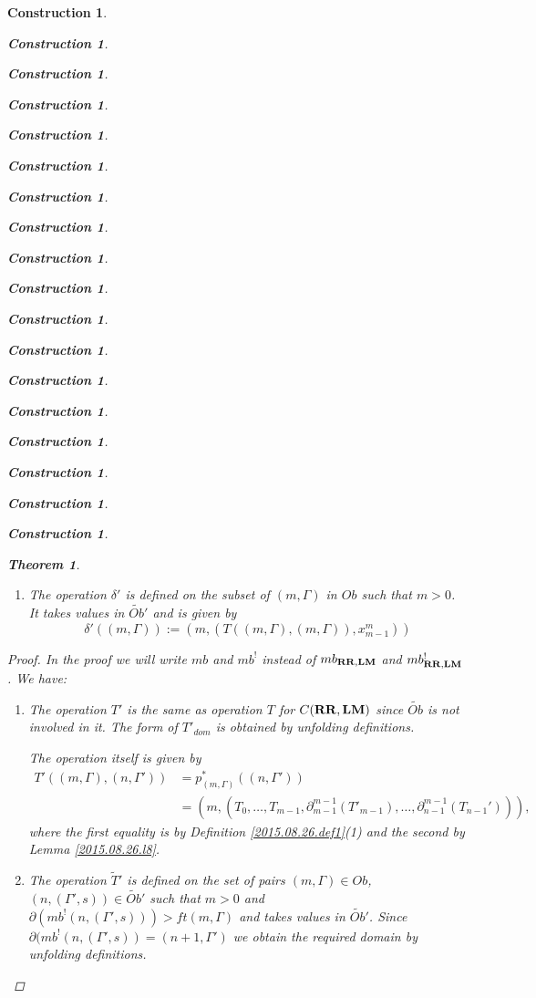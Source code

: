 \documentclass[12pt]{amsart}
\newtheorem{theorem}[proposition]{Theorem}
\numberwithin{proposition}{subsection}
\newtheorem{construction}[proposition]{Construction}
\newcommand{\wt}{\widetilde}
\newcommand{\RR}{{\bf RR}}
\newcommand{\LM}{{\bf LM}}
\begin{document}
\begin{construction}
\begin{construction}
\begin{construction}
\begin{construction}
\begin{construction}
\begin{construction}
\begin{construction}
\begin{construction}
\begin{construction}
\begin{construction}
\begin{construction}
\begin{construction}
\begin{construction}
\begin{construction}
\begin{construction}
\begin{construction}
\begin{construction}
\begin{construction}
\begin{theorem}
\begin{enumerate}
$$\wt{S}'((m,(\Gamma,r)),(n,(\Gamma',s))):=(n-1,(S'((m,(\Gamma,r)),(n+1,\Gamma'))),\theta_{m,n}(r,s))$$
%
\item The operation $\delta'$ is defined on the subset of $(m,\Gamma)$ in $Ob$ such
  that $m>0$. It takes values in $\wt{Ob}'$ and is given by
%
$$\delta'((m,\Gamma)):=(m,(T((m,\Gamma),(m,\Gamma)),x_{m-1}^m))$$
%
\end{enumerate}
\end{theorem}
%
\begin{proof}
In the proof we will write $mb$ and $mb^!$ instead of $mb_{\RR,\LM}$ and
$mb^!_{\RR,\LM}$. We have:
%
\begin{enumerate}
%
\item The operation $T'$ is the same as operation $T$ for $C(\RR,\LM)$ since
  $\wt{Ob}$ is not involved in it. The form of $T'_{dom}$ is obtained by
  unfolding definitions.

The operation itself is given by 
\begin{equation*}
  \begin{split}
    T'((m,\Gamma),(n,\Gamma'))&=p_{(m,\Gamma)}^*((n,\Gamma'))\\
    &=(m,(T_0,\dots,T_{m-1},\partial_{m-1}^{m-1}(T'_{m-1}),\dots, \partial_{n-1}^{m-1}(T_{n-1}'))),
  \end{split}
\end{equation*}
where the first equality is by Definition \ref{2015.08.26.def1}(1) and the second by Lemma \ref{2015.08.26.l8}. 
%
\item The operation $\wt{T}'$ is defined on the set of pairs $(m,\Gamma)\in Ob$,
  $(n,(\Gamma',s))\in \wt{Ob}'$ such that $m>0$ and
  $\partial(mb^!(n,(\Gamma',s)))>ft(m,\Gamma)$ and takes values in
  $\wt{Ob}'$. Since $\partial(mb^!(n,(\Gamma',s))=(n+1,\Gamma')$ we obtain the
  required domain by unfolding definitions.


\end{enumerate}
\end{proof}
\end{construction}
\end{construction}
\end{construction}
\end{construction}
\end{construction}
\end{construction}
\end{construction}
\end{construction}
\end{construction}
\end{construction}
\end{construction}
\end{construction}
\end{construction}
\end{construction}
\end{construction}
\end{construction}
\end{construction}
\end{construction}
\end{document}
